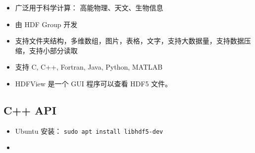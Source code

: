 

\begin{issues}
\issueDraft
\end{issues}

\begin{itemize}
\item 广泛用于科学计算： 高能物理、天文、生物信息
\item 由 HDF Group 开发
\item 支持文件夹结构，多维数组，图片，表格，文字，支持大数据量，支持数据压缩，支持小部分读取
\item 支持 C, C++, Fortran, Java, Python, MATLAB
\item HDFView 是一个 GUI 程序可以查看 HDF5 文件。
\end{itemize}

\subsection{C++ API}
\begin{itemize}
\item Ubuntu 安装： \verb|sudo apt install libhdf5-dev|
\item 
\end{itemize}
